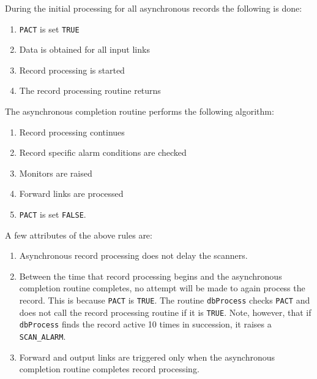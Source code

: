 During the initial processing for all asynchronous records the following is done:

\begin{enumerate}
\item \verb|PACT| is set \verb|TRUE|

\item Data is obtained for all input links

\item Record processing is started

\item The record processing routine returns

\end{enumerate}

The asynchronous completion routine performs the following algorithm:

\begin{enumerate}
\item Record processing continues

\item Record specific alarm conditions are checked

\item Monitors are raised

\item Forward links are processed

\item \verb|PACT| is set \verb|FALSE|.

\end{enumerate}

A few attributes of the above rules are:

\begin{enumerate}
\item Asynchronous record processing does not delay the scanners.

\item Between the time that record processing begins and the asynchronous completion routine completes, no attempt will be made to again process the record.
This is because \verb|PACT| is \verb|TRUE|.
The routine \verb|dbProcess| checks \verb|PACT| and does not call the record processing routine if it is \verb|TRUE|.
Note, however, that if \verb|dbProcess| finds the record active 10 times in succession, it raises a \verb|SCAN_ALARM|.

\item Forward and output links are triggered only when the asynchronous completion routine completes record processing.

\end{enumerate}


